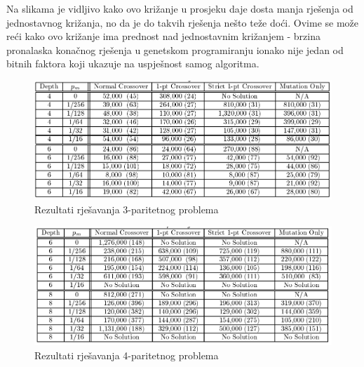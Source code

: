 Na slikama je vidljivo kako ovo križanje u prosjeku daje dosta manja rješenja od jednostavnog križanja, no da je do takvih rješenja nešto teže doći. Ovime se može reći kako ovo križanje ima prednost nad jednostavnim križanjem - brzina pronalaska konačnog rješenja u genetskom programiranju ionako nije jedan od bitnih faktora koji ukazuje na uspješnost samog algoritma.

 \begin{figure}[H]
	\centering
	\includegraphics[scale=0.4]{./slike/even3par.png}
	\caption{Rezultati rješavanja 3-paritetnog problema}
	\label{even3par}
\end{figure}

 \begin{figure}[H]
	\centering
	\includegraphics[scale=0.4]{./slike/even4par.png}
	\caption{Rezultati rješavanja 4-paritetnog problema}
	\label{even4par}
\end{figure}

